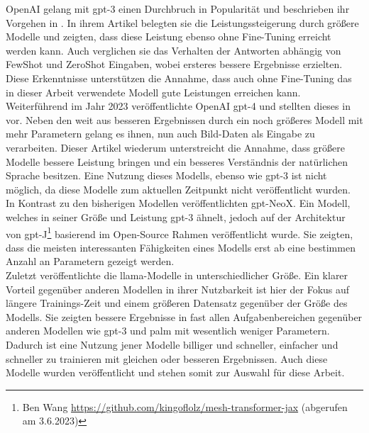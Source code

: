 OpenAI gelang mit \ac{gpt}-3 einen Durchbruch in Popularität und beschrieben ihr Vorgehen in \citet{gpt3}.
In ihrem Artikel belegten sie die Leistungssteigerung durch größere Modelle und zeigten, dass diese Leistung ebenso ohne Fine-Tuning erreicht werden kann. 
Auch verglichen sie das Verhalten der Antworten abhängig von FewShot und ZeroShot Eingaben, wobei ersteres bessere Ergebnisse erzielten. 
Diese Erkenntnisse unterstützen die Annahme, dass auch ohne Fine-Tuning das in dieser Arbeit verwendete Modell gute Leistungen erreichen kann.\\

Weiterführend im Jahr 2023 veröffentlichte OpenAI \ac{gpt}-4 und stellten dieses in \citet{gpt4} vor. 
Neben den weit aus besseren Ergebnissen durch ein noch größeres Modell mit mehr Parametern gelang es ihnen, nun auch Bild-Daten als Eingabe zu verarbeiten. 
Dieser Artikel wiederum unterstreicht die Annahme, dass größere Modelle bessere Leistung bringen und ein besseres Verständnis der natürlichen Sprache besitzen.
Eine Nutzung dieses Modells, ebenso wie \ac{gpt}-3 ist nicht möglich, da diese Modelle zum aktuellen Zeitpunkt nicht veröffentlicht wurden.\\

In Kontrast zu den bisherigen Modellen veröffentlichten \citet{gpt_neox} \ac{gpt}-NeoX. 
Ein Modell, welches in seiner Größe und Leistung \ac{gpt}-3 ähnelt, jedoch auf der Architektur von \ac{gpt}-J\footnote{Ben Wang \url{https://github.com/kingoflolz/mesh-transformer-jax} (abgerufen am 3.6.2023)} basierend im Open-Source Rahmen veröffentlicht wurde. 
Sie zeigten, dass die meisten interessanten Fähigkeiten eines Modells erst ab eine bestimmen Anzahl an Parametern gezeigt werden.\\

Zuletzt veröffentlichte \citet{llama} die \ac{llama}-Modelle in unterschiedlicher Größe. 
Ein klarer Vorteil gegenüber anderen Modellen in ihrer Nutzbarkeit ist hier der Fokus auf längere Trainings-Zeit und einem größeren Datensatz gegenüber der Größe des Modells. 
Sie zeigten bessere Ergebnisse in fast allen Aufgabenbereichen gegenüber anderen Modellen wie \ac{gpt}-3 und \ac{palm} mit wesentlich weniger Parametern. 
Dadurch ist eine Nutzung jener Modelle billiger und schneller, einfacher und schneller zu trainieren mit gleichen oder besseren Ergebnissen. 
Auch diese Modelle wurden veröffentlicht und stehen somit zur Auswahl für diese Arbeit.

